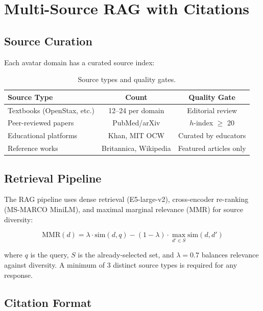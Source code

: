 \documentclass[11pt,letterpaper]{article}
\begin{document}
\section{Multi-Source RAG with Citations}

\subsection{Source Curation}

Each avatar domain has a curated source index:

\begin{table}[t]
\centering
\begin{tabular}{lcc}
\toprule
\textbf{Source Type} & \textbf{Count} & \textbf{Quality Gate} \\
\midrule
Textbooks (OpenStax, etc.) & 12--24 per domain & Editorial review \\
Peer-reviewed papers & PubMed/arXiv & $h$-index $\geq$ 20 \\
Educational platforms & Khan, MIT OCW & Curated by educators \\
Reference works & Britannica, Wikipedia & Featured articles only \\
\bottomrule
\end{tabular}
\caption{Source types and quality gates.}
\label{tab:sources}
\end{table}

\subsection{Retrieval Pipeline}

The RAG pipeline uses dense retrieval (E5-large-v2), cross-encoder re-ranking (MS-MARCO MiniLM), and maximal marginal relevance (MMR) for source diversity:

\begin{equation}
\text{MMR}(d) = \lambda \cdot \text{sim}(d, q) - (1-\lambda) \cdot \max_{d' \in S} \text{sim}(d, d')
\label{eq:mmr}
\end{equation}

where $q$ is the query, $S$ is the already-selected set, and $\lambda = 0.7$ balances relevance against diversity. A minimum of 3 distinct source types is required for any response.

\subsection{Citation Format}
\end{document}
